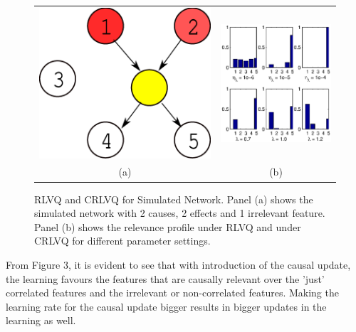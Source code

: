 \documentclass{esannV2}
\begin{document}
\begin{figure}[!h]
\begin{tabular}{cc}
\includegraphics[scale=0.2]{simnetwork.eps} & 
\includegraphics[width=.6\textwidth, height=.5\textwidth]{simlambda.eps} \\
(a) &  (b)  
\end{tabular}
\label{fig:simnetwork}
\caption{RLVQ and CRLVQ for Simulated Network. Panel (a) shows the simulated network with 2 causes, 2 effects and 1 irrelevant feature. Panel (b) shows the relevance profile under RLVQ and under CRLVQ for different parameter settings.}
\end{figure}

From Figure 3, it is evident to see that with introduction of the causal update, the learning favours the features that are causally relevant over the 'just' correlated features and the irrelevant or non-correlated features. Making the learning rate for the causal update bigger results in bigger updates in the learning as well.
\end{document}

